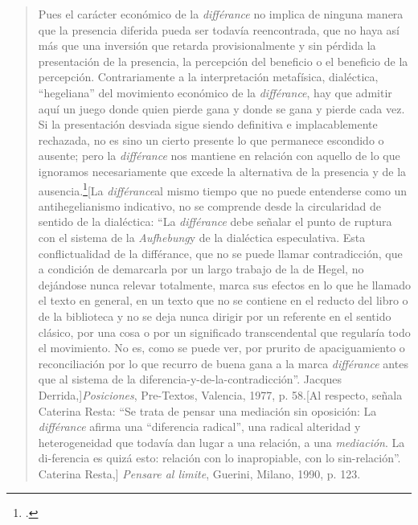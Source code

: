 \documentclass{book}
\begin{document}
\begin{quote}
Pues el carácter económico de la \emph{différance} no implica de ninguna
manera que la presencia diferida pueda ser todavía reencontrada, que no
haya así más que una inversión que retarda provisionalmente y sin
pérdida la presentación de la presencia, la percepción del beneficio o
el beneficio de la percepción. Contrariamente a la interpretación
metafísica, dialéctica, ``hegeliana'' del movimiento económico de la
\emph{différance}, hay que admitir aquí un juego donde quien pierde gana
y donde se gana y pierde cada vez. Si la presentación desviada sigue
siendo definitiva e implacablemente rechazada, no es sino un cierto
presente lo que permanece escondido o ausente; pero la \emph{différance}
nos mantiene en relación con aquello de lo que ignoramos necesariamente
que excede la alternativa de la presencia y de la ausencia.\footcites[21]{derrida1989b}[La
  \emph{différance}al mismo tiempo que no puede entenderse como un
  antihegelianismo indicativo, no se comprende desde la circularidad de
  sentido de la dialéctica: \enquote{La \emph{différance} debe señalar el punto
  de ruptura con el sistema de la \emph{Aufhebung}y de la dialéctica
  especulativa. Esta conflictualidad de la différance, que no se puede
  llamar contradicción, que a condición de demarcarla por un largo
  trabajo de la de Hegel, no dejándose nunca relevar totalmente, marca
  sus efectos en lo que he llamado el texto en general, en un texto que
  no se contiene en el reducto del libro o de la biblioteca y no se deja
  nunca dirigir por un referente en el sentido clásico, por una cosa o
  por un significado transcendental que regularía todo el movimiento. No
  es, como se puede ver, por prurito de apaciguamiento o reconciliación
  por lo que recurro de buena gana a la marca \emph{différance}
  antes que al sistema de la diferencia-y-de-la-contradicción}. Jacques
  Derrida,]{\emph{Posiciones}, Pre-Textos, Valencia, 1977, p. 58.}[Al
  respecto, señala Caterina Resta: \enquote{Se trata de pensar una mediación sin
  oposición: La \emph{différance} afirma una ``diferencia radical'',
  una radical alteridad y heterogeneidad que todavía dan lugar a una
  relación, a una \emph{mediación}. La di-ferencia es quizá esto:
  relación con lo inapropiable, con lo sin-relación}. Caterina Resta,]
  {\emph{Pensare al limite}, Guerini, Milano, 1990, p. 123.}
\end{quote}
\end{document}

